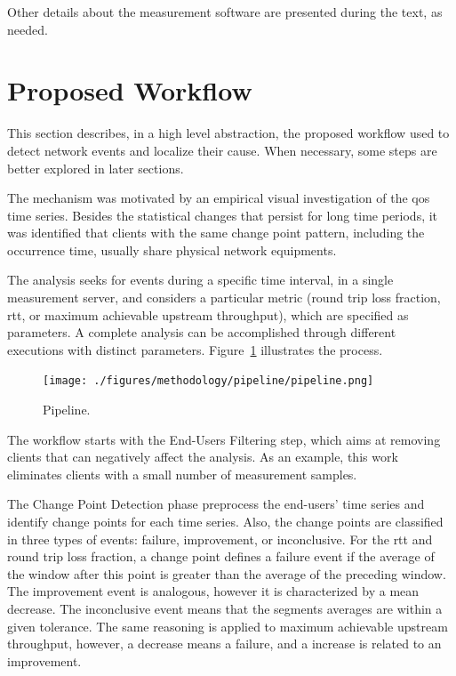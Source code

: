 Other details about the
measurement software are presented during the text, as needed.

\section{Proposed Workflow}
\label{sec:pipeline}

This section describes, in a high level abstraction, the proposed workflow
used to detect network events and localize their cause. When necessary, some
steps are better explored in later sections.

The mechanism was motivated by an empirical visual investigation of the
\gls*{qos} time series.
Besides the statistical changes that persist for long time periods,
it was identified that clients with the same
change point pattern, including the occurrence time,
usually share physical network equipments.

The analysis seeks for events during a specific time interval, in a single
measurement server, and considers a
particular metric (round trip loss fraction, \gls*{rtt}, or maximum achievable
upstream throughput),
which are specified as parameters.
A complete analysis can be accomplished through different
executions with distinct parameters.
Figure~\ref{fig:pipeline} illustrates the process.

\begin{figure}[H]
    \centering
    \texttt{[image: ./figures/methodology/pipeline/pipeline.png]}
    \caption{Pipeline.}
\label{fig:pipeline}
\end{figure}%

The workflow starts with the End-Users Filtering step,
which aims at removing clients that can negatively affect the analysis.
As an example, this work eliminates clients
with a small number of measurement samples.

The Change Point Detection phase preprocess the end-users' time series and
identify change points for each time series.
Also, the change points are classified in three types of events: failure,
improvement, or inconclusive. For the \gls*{rtt} and round trip loss fraction,
a change point defines a
failure event if the average of the window after this point is greater than the
average of the preceding window. The improvement event is analogous, however it
is characterized by a mean decrease.
The inconclusive event means that the segments averages are within a given
tolerance.
The same reasoning is applied to maximum
achievable upstream throughput, however, a decrease means a failure, and a
increase is related to an improvement.

